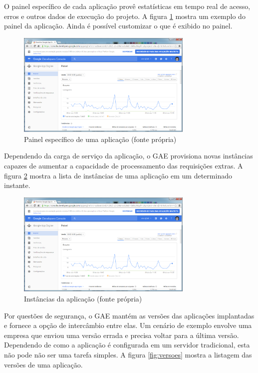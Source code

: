 \documentclass[12pt]{article}
\begin{document}
O painel específico de cada aplicação provê estatísticas em tempo real de
acesso, erros e outros dados de execução do projeto. A figura
\ref{fig:painel-app} mostra um exemplo do painel da aplicação. Ainda é possível
customizar o que é exibido no painel.

\begin{figure}
    \centering
    \includegraphics[width=0.75\textwidth]{painel-app.png}
    \caption{Painel específico de uma aplicação (fonte própria)}
    \label{fig:painel-app}
\end{figure}

Dependendo da carga de serviço da aplicação, o GAE provisiona novas instâncias
capazes de aumentar a capacidade de processamento das requisições extras. A
figura \ref{fig:instancias} mostra a lista de instâncias de uma aplicação em um
determinado instante.

\begin{figure}
    \centering
    \includegraphics[width=0.75\textwidth]{painel-app.png}
    \caption{Instâncias da aplicação (fonte própria)}
    \label{fig:instancias}
\end{figure}

Por questões de segurança, o GAE mantém as versões das aplicações implantadas e
fornece a opção de intercâmbio entre elas. Um cenário de exemplo envolve uma
empresa que enviou uma versão errada e precisa voltar para a última versão.
Dependendo de como a aplicação é configurada em um servidor tradicional, esta
não pode não ser uma tarefa simples. A figura \ref{fig:versoes} mostra a
listagem das versões de uma aplicação.
\end{document}
